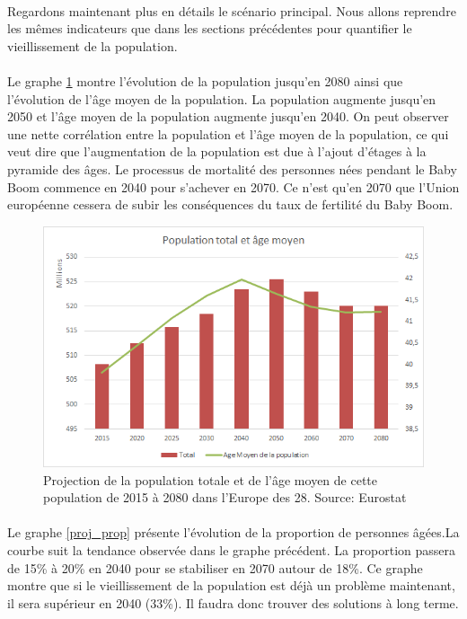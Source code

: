 \paragraph{}Regardons maintenant plus en détails le scénario principal. Nous allons reprendre les mêmes indicateurs que dans les sections précédentes pour quantifier le vieillissement de la population. 

\paragraph{}Le graphe \ref{proj_pop} montre l’évolution de la population jusqu’en 2080 ainsi que l’évolution de l’âge moyen de la population. La population augmente jusqu’en 2050 et l’âge moyen de la population augmente jusqu’en 2040. On peut observer une nette corrélation entre la population et l’âge moyen de la population, ce qui veut dire que l’augmentation de la population est due à l’ajout d’étages à la pyramide des âges. Le processus de mortalité des personnes nées pendant le Baby Boom commence en 2040 pour s’achever en 2070. Ce n’est qu’en 2070 que l’Union européenne cessera de subir les conséquences du taux de fertilité du Baby Boom. 


\begin{figure}[h!]
    \begin{center}
        \includegraphics[scale=0.7]{document/proj_pop.png}
        \caption{Projection de la population totale et de l'âge moyen de cette population de 2015 à 2080 dans l'Europe des 28. Source: Eurostat~\citep{eurostat_europop13}}
        \label{proj_pop}
    \end{center}
\end{figure}

\paragraph{}Le graphe \ref{proj_prop} présente l’évolution de la proportion de personnes âgées.La courbe suit la tendance observée dans le graphe précédent. La proportion passera de 15\% à 20\% en 2040 pour se stabiliser en 2070 autour de 18\%. Ce graphe montre que si le vieillissement de la population est déjà un problème maintenant, il sera supérieur en 2040 (33\%). Il faudra donc trouver des solutions à long terme.

